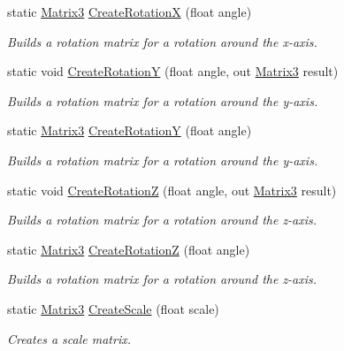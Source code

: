\begin{DoxyCompactItemize}
static \hyperlink{struct_open_t_k_1_1_matrix3}{Matrix3} \hyperlink{struct_open_t_k_1_1_matrix3_ac5b10912da6763d7950ee1ff356243eb}{Create\-Rotation\-X} (float angle)
\begin{DoxyCompactList}\small\item\em Builds a rotation matrix for a rotation around the x-\/axis. \end{DoxyCompactList}\item 
static void \hyperlink{struct_open_t_k_1_1_matrix3_ab728882d28ae3b87369d089bf44f7c7a}{Create\-Rotation\-Y} (float angle, out \hyperlink{struct_open_t_k_1_1_matrix3}{Matrix3} result)
\begin{DoxyCompactList}\small\item\em Builds a rotation matrix for a rotation around the y-\/axis. \end{DoxyCompactList}\item 
static \hyperlink{struct_open_t_k_1_1_matrix3}{Matrix3} \hyperlink{struct_open_t_k_1_1_matrix3_a438bffa581b1c6cf621e47c32d5d1b14}{Create\-Rotation\-Y} (float angle)
\begin{DoxyCompactList}\small\item\em Builds a rotation matrix for a rotation around the y-\/axis. \end{DoxyCompactList}\item 
static void \hyperlink{struct_open_t_k_1_1_matrix3_a755875b0b3325d79af5f51f7a1b77ae4}{Create\-Rotation\-Z} (float angle, out \hyperlink{struct_open_t_k_1_1_matrix3}{Matrix3} result)
\begin{DoxyCompactList}\small\item\em Builds a rotation matrix for a rotation around the z-\/axis. \end{DoxyCompactList}\item 
static \hyperlink{struct_open_t_k_1_1_matrix3}{Matrix3} \hyperlink{struct_open_t_k_1_1_matrix3_a641172bcef1c93c0d358a1629e3e2910}{Create\-Rotation\-Z} (float angle)
\begin{DoxyCompactList}\small\item\em Builds a rotation matrix for a rotation around the z-\/axis. \end{DoxyCompactList}\item 
static \hyperlink{struct_open_t_k_1_1_matrix3}{Matrix3} \hyperlink{struct_open_t_k_1_1_matrix3_a850e017e52a4fc4005cda4c1f6112ab8}{Create\-Scale} (float scale)
\begin{DoxyCompactList}\small\item\em Creates a scale matrix. \end{DoxyCompactList}\item 

\end{DoxyCompactItemize}
